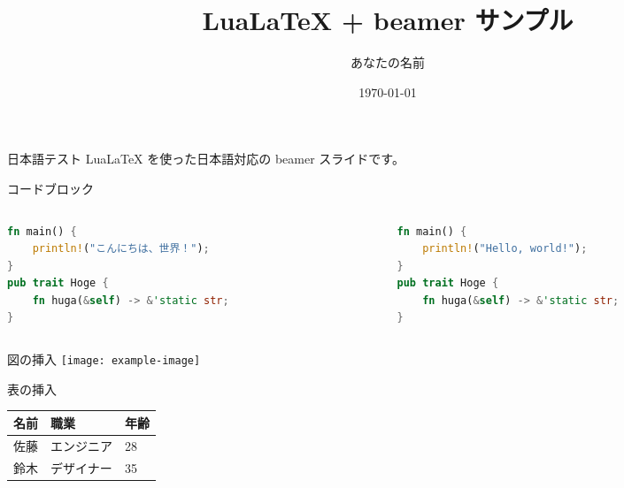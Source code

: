 \documentclass[aspectratio=169]{beamer}
\title{LuaLaTeX + beamer サンプル}
\author{あなたの名前}
\date{\today}
\begin{document}
\frame{\titlepage}

\begin{frame}{日本語テスト}
    LuaLaTeX を使った日本語対応の beamer スライドです。
\end{frame}

\begin{frame}[fragile]{コードブロック}
    \begin{columns}
        \begin{column}{0.5\linewidth}
            \begin{lstlisting}[language=Rust,style=mdRust]
fn main() {
    println!("こんにちは、世界！");
}
pub trait Hoge {
    fn huga(&self) -> &'static str;
}
\end{lstlisting}
        \end{column}
        \begin{column}{0.5\linewidth}
            \begin{lstlisting}[language=Rust,style=mdRust]
fn main() {
    println!("Hello, world!");
}
pub trait Hoge {
    fn huga(&self) -> &'static str;
}
\end{lstlisting}
        \end{column}
    \end{columns}

\end{frame}

\begin{frame}{図の挿入}
    \texttt{[image: example-image]}
\end{frame}

\begin{frame}{表の挿入}
    \begin{tabular}{lll}
        \toprule
        名前 & 職業    & 年齢 \\
        \midrule
        佐藤 & エンジニア & 28 \\
        鈴木 & デザイナー & 35 \\
        \bottomrule
    \end{tabular}
\end{frame}
\end{document}
